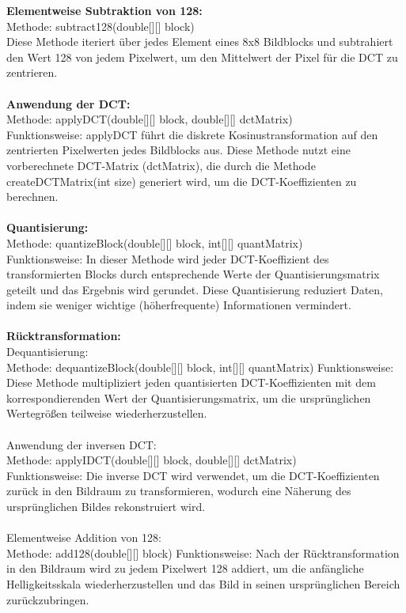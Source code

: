 \documentclass[12pt]{article}
\begin{document}
\textbf{Elementweise Subtraktion von 128:}\\
Methode: subtract128(double[][] block)\\
Diese Methode iteriert über jedes Element eines 8x8 Bildblocks und subtrahiert den Wert 128 von jedem Pixelwert, um den Mittelwert der Pixel für die DCT zu zentrieren.\\\\

\textbf{Anwendung der DCT:}\\
Methode: applyDCT(double[][] block, double[][] dctMatrix)\\
Funktionsweise: applyDCT führt die diskrete Kosinustransformation auf den zentrierten Pixelwerten jedes Bildblocks aus. Diese Methode nutzt eine vorberechnete DCT-Matrix (dctMatrix), die durch die Methode createDCTMatrix(int size) generiert wird, um die DCT-Koeffizienten zu berechnen.\\\\

\textbf{Quantisierung:}\\
Methode: quantizeBlock(double[][] block, int[][] quantMatrix)\\
Funktionsweise: In dieser Methode wird jeder DCT-Koeffizient des transformierten Blocks durch entsprechende Werte der Quantisierungsmatrix geteilt und das Ergebnis wird gerundet. Diese Quantisierung reduziert Daten, indem sie weniger wichtige (höherfrequente) Informationen vermindert.\\\\

\textbf{Rücktransformation:}\\
Dequantisierung: \\
Methode: dequantizeBlock(double[][] block, int[][] quantMatrix)
Funktionsweise: Diese Methode multipliziert jeden quantisierten DCT-Koeffizienten mit dem korrespondierenden Wert der Quantisierungsmatrix, um die ursprünglichen Wertegrößen teilweise wiederherzustellen.\\\\
Anwendung der inversen DCT: \\
Methode: applyIDCT(double[][] block, double[][] dctMatrix)\\
Funktionsweise: Die inverse DCT wird verwendet, um die DCT-Koeffizienten zurück in den Bildraum zu transformieren, wodurch eine Näherung des ursprünglichen Bildes rekonstruiert wird.\\\\
Elementweise Addition von 128:\\
Methode: add128(double[][] block)
Funktionsweise: Nach der Rücktransformation in den Bildraum wird zu jedem Pixelwert 128 addiert, um die anfängliche Helligkeitsskala wiederherzustellen und das Bild in seinen ursprünglichen Bereich zurückzubringen.
\end{document}
